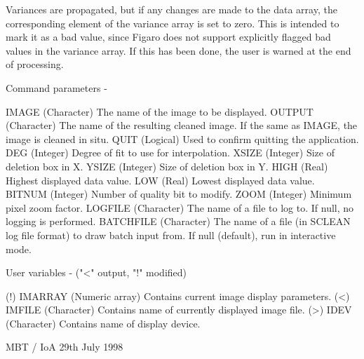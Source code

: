 \begin{description}
\begin{terminalv}
 Variances are propagated, but if any changes are made to the
 data array, the corresponding element of the variance array
 is set to zero.  This is intended to mark it as a bad value,
 since Figaro does not support explicitly flagged bad values
 in the variance array.  If this has been done, the user is
 warned at the end of processing.

 Command parameters -

 IMAGE      (Character) The name of the image to be displayed.
 OUTPUT     (Character) The name of the resulting cleaned image.
            If the same as IMAGE, the image is cleaned in situ.
 QUIT       (Logical) Used to confirm quitting the application.
 DEG        (Integer) Degree of fit to use for interpolation.
 XSIZE      (Integer) Size of deletion box in X.
 YSIZE      (Integer) Size of deletion box in Y.
 HIGH       (Real) Highest displayed data value.
 LOW        (Real) Lowest displayed data value.
 BITNUM     (Integer) Number of quality bit to modify.
 ZOOM       (Integer) Minimum pixel zoom factor.
 LOGFILE    (Character) The name of a file to log to.  If null,
            no logging is performed.
 BATCHFILE  (Character) The name of a file (in SCLEAN log file
            format) to draw batch input from.  If null (default),
            run in interactive mode.

 User variables -  ("<" output, "!" modified)

 (!) IMARRAY (Numeric array) Contains current image display
             parameters.
 (<) IMFILE  (Character) Contains name of currently displayed
             image file.
 (>) IDEV    (Character) Contains name of display device.

                                    MBT / IoA 29th July 1998
\end{terminalv}
\end{description}
